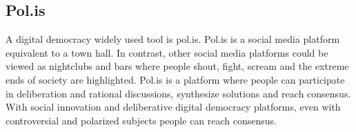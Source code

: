 \documentclass{IEEEtran}
\begin{document}





\subsection{Pol.is}
A digital democracy widely used tool is pol.is. Pol.is is a social media platform equivalent to a town hall. In contrast, other social media platforms could be viewed as nightclubs and bars where people shout, fight, scream and the extreme ends of society are highlighted. Pol.is is a platform where people can participate in deliberation and rational discussions, synthesize solutions and reach consensus.
With social innovation and deliberative digital democracy platforms, even with controversial and polarized subjects people can reach consensus.
\end{document}
